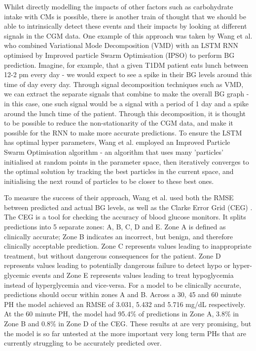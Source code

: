       Whilst directly modelling the impacts of other factors such as carbohydrate intake with CMs is possible, there is another train of thought that we should be able to intrinsically detect these events and their impacts by looking at different signals in the CGM data. One example of this approach was taken by Wang et al. \cite{paper8} who combined Variational Mode Decomposition (VMD) with an LSTM RNN optimised by Improved particle Swarm Optimisation (IPSO) to perform BG prediction. Imagine, for example, that a given T1DM patient eats lunch between 12-2 pm every day - we would expect to see a spike in their BG levels around this time of day every day. Through signal decomposition techniques such as VMD, we can extract the separate signals that combine to make the overall BG graph - in this case, one such signal would be a signal with a period of 1 day and a spike around the lunch time of the patient. Through this decomposition, it is thought to be possible to reduce the non-stationarity of the CGM data, and make it possible for the RNN to make more accurate predictions. To ensure the LSTM has optimal hyper parameters, Wang et al. \cite{paper8} employed an Improved Particle Swarm Optimisation algorithm - an algorithm that uses many 'particles' initialised at random points in the parameter space, then iteratively converges to the optimal solution by tracking the best particles in the current space, and initialising the next round of particles to be closer to these best ones.

      To measure the success of their approach, Wang et al. \cite{paper8} used both the RMSE between predicted and actual BG levels, as well as the Clarke Error Grid (CEG) \cite{CEGA}. The CEG is a tool for checking the accuracy of blood glucose monitors. It splits predictions into 5 separate zones: A, B, C, D and E. Zone A is defined as clinically accurate; Zone B indicates an incorrect, but benign, and therefore clinically acceptable prediction. Zone C represents values leading to inappropriate treatment, but without dangerous consequences for the patient. Zone D represents values leading to potentially dangerous failure to detect hypo or hyper-glycemic events and Zone E represents values leading to treat hypoglycemia instead of hyperglycemia and vice-versa. For a model to be clinically accurate, predictions should occur within zones A and B. Across a 30, 45 and 60 minute PH the model achieved an RMSE of 3.031, 5.432 and 5.716 mg/dL respectively. At the 60 minute PH, the model had 95.4\% of predictions in Zone A, 3.8\% in Zone B and 0.8\% in Zone D of the CEG. These results at are very promising, but the model is so far untested at the more important very long term PHs that are currently struggling to be accurately predicted over.


